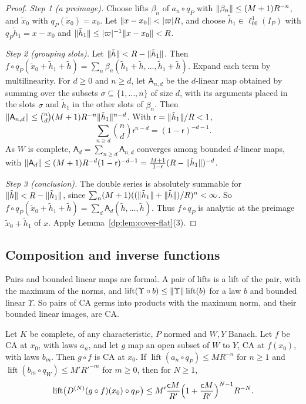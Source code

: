 \begin{proof}
\emph{Step 1 (a preimage).} Choose lifts $\beta_n$ of $a_n\circ q_P$ with $\lVert \beta_n\rVert\le(M+1)R^{-n}$, and $\tilde x_0$ with $q_P(\tilde x_0)=x_0$. Let $\lVert x-x_0\rVert<\lvert \varpi\rvert R$, and choose $\tilde h_1\in\ell^1_{00}(I_P)$ with $q_P\tilde h_1=x-x_0$ and $\lVert \tilde h_1\rVert\le\lvert \varpi\rvert^{-1}\lVert x-x_0\rVert<R$.

\emph{Step 2 (grouping slots).} Let $\lVert \tilde h\rVert<R-\lVert \tilde h_1\rVert$. Then $f\circ q_P(\tilde x_0+\tilde h_1+\tilde h)=\sum_n\beta_n(\tilde h_1+\tilde h,\dots,\tilde h_1+\tilde h)$. Expand each term by multilinearity. For $d\ge0$ and $n\ge d$, let $\mathsf A_{n,d}$ be the $d$-linear map obtained by summing over the subsets $\sigma\subseteq\{1,\dots,n\}$ of size $d$, with its arguments placed in the slots $\sigma$ and $\tilde h_1$ in the other slots of $\beta_n$. Then $\lVert \mathsf A_{n,d}\rVert\le\binom nd(M+1)R^{-n}\lVert \tilde h_1\rVert^{n-d}$. With $\mathsf r=\lVert \tilde h_1\rVert/R<1$,
\[
 \sum_{n\ge d}\binom nd\mathsf r^{n-d}=(1-\mathsf r)^{-d-1}.
\]
As $W$ is complete, $\mathsf A_d=\sum_{n\ge d}\mathsf A_{n,d}$ converges among bounded $d$-linear maps, with $\lVert \mathsf A_d\rVert\le(M+1)R^{-d}(1-\mathsf r)^{-d-1}=\frac{M+1}{1-\mathsf r}(R-\lVert \tilde h_1\rVert)^{-d}$.

\emph{Step 3 (conclusion).} The double series is absolutely summable for $\lVert \tilde h\rVert<R-\lVert \tilde h_1\rVert$, since $\sum_n(M+1)((\lVert \tilde h_1\rVert+\lVert \tilde h\rVert)/R)^n<\infty$. So $f\circ q_P(\tilde x_0+\tilde h_1+\tilde h)=\sum_d\mathsf A_d(\tilde h,\dots,\tilde h)$. Thus $f\circ q_P$ is analytic at the preimage $\tilde x_0+\tilde h_1$ of $x$. Apply Lemma~\ref{dp:lem:cover-flat}(3).
\end{proof}

\subsection{Composition and inverse functions}\label{dp:ssec:ca-calculus}

Pairs and bounded linear maps are formal. A pair of lifts is a lift of the pair, with the maximum of the norms, and $\operatorname{lift}(\Upsilon\circ b)\le\lVert \Upsilon\rVert\operatorname{lift}(b)$ for a law $b$ and bounded linear $\Upsilon$. So pairs of CA germs into products with the maximum norm, and their bounded linear images, are CA.

\begin{theorem}[composition]\label{dp:thm:ca-composition}
Let $K$ be complete, of any characteristic, $P$ normed and $W,Y$ Banach. Let $f$ be CA at $x_0$, with laws $a_n$, and let $g$ map an open subset of $W$ to $Y$, CA at $f(x_0)$, with laws $b_m$. Then $g\circ f$ is CA at $x_0$. If $\operatorname{lift}(a_n\circ q_P)\le MR^{-n}$ for $n\ge1$ and $\operatorname{lift}(b_m\circ q_W)\le M'R'^{-m}$ for $m\ge0$, then for $N\ge1$,
\[
 \operatorname{lift}\bigl(D^{(N)}(g\circ f)(x_0)\circ q_P\bigr)\le M'\frac{\mathsf cM}{R'}\Bigl(1+\frac{\mathsf cM}{R'}\Bigr)^{N-1}R^{-N}.
\]
\end{theorem}

